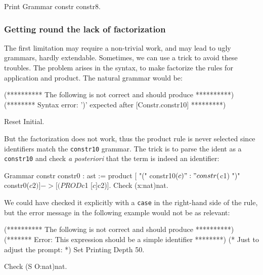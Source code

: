 {\begin{coq_example}
Print Grammar constr constr8.
\end{coq_example}

\subsubsection{Getting round the lack of factorization}
The first limitation may require a non-trivial work, and may lead to
ugly grammars, hardly extendable. Sometimes, we can use a trick to
avoid these troubles. The problem arises in the {\gallina} syntax, to
make {\camlpppp} factorize the rules for application and product. The
natural grammar would be:

\begin{coq_eval}
(********** The following is not correct and should produce **********)
(******** Syntax error: ')' expected after [Constr.constr10] *********)
\end{coq_eval}

\begin{coq_eval}
Reset Initial.
\end{coq_eval}

But the factorization does not work, thus the product rule is never
selected since identifiers match the {\tt constr10} grammar. The
trick is to parse the ident as a {\tt constr10} and check \emph{a
posteriori} that the term is indeed an identifier:

\begin{coq_example}
Grammar constr constr0 : ast :=
  product [ "(" constr10($c) ":" constr($c1) ")" constr0($c2) ] ->
            [(PROD $c1 [$c]$c2)].
Check (x:nat)nat.
\end{coq_example}

\noindent We could have checked it explicitly with a {\tt case} in
the right-hand side of the rule, but the error message in the
following example would not be as relevant:

\begin{coq_eval}
(********** The following is not correct and should produce **********)
(******* Error: This expression should be a simple identifier ********)
(* Just to adjust the prompt: *) Set Printing Depth 50.
\end{coq_eval}
\begin{coq_example}
Check (S O:nat)nat.
\end{coq_example}

}

